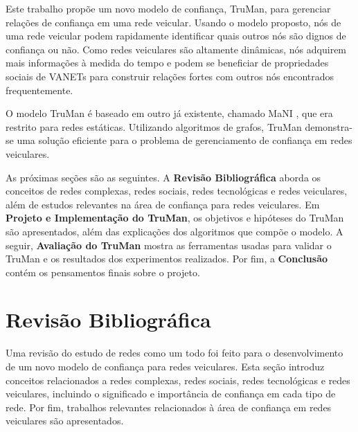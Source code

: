 \begin{resumoextendido}
	Este trabalho propõe um novo modelo de confiança, TruMan, para gerenciar relações de confiança em uma rede veicular.
	Usando o modelo proposto, nós de uma rede veicular podem rapidamente identificar quais outros nós são dignos de confiança ou não.
	Como redes veiculares são altamente dinâmicas, nós adquirem mais informações à medida do tempo e podem se beneficiar de propriedades sociais de VANETs para construir relações fortes com outros nós encontrados frequentemente.
	
	O modelo TruMan é baseado em outro já existente, chamado MaNI \citep{vernize2015malicious}, que era restrito para redes estáticas.
	Utilizando algoritmos de grafos, TruMan demonstra-se uma solução eficiente para o problema de gerenciamento de confiança em redes veiculares.
	
	As próximas seções são as seguintes.
	A \textbf{Revisão Bibliográfica} aborda os conceitos de redes complexas, redes sociais, redes tecnológicas e redes veiculares, além de estudos relevantes na área de confiança para redes veiculares.
	Em \textbf{Projeto e Implementação do TruMan}, os objetivos e hipóteses do TruMan são apresentados, além das explicações dos algoritmos que compõe o modelo.
	A seguir, \textbf{Avaliação do TruMan} mostra as ferramentas usadas para validar o TruMan e os resultados dos experimentos realizados.
	Por fim, a \textbf{Conclusão} contém os pensamentos finais sobre o projeto.
		
	\section*{Revisão Bibliográfica}
	
	Uma revisão do estudo de redes como um todo foi feito para o desenvolvimento de um novo modelo de confiança para redes veiculares.
	Esta seção introduz conceitos relacionados a redes complexas, redes sociais, redes tecnológicas e redes veiculares, incluindo o significado e importância de confiança em cada tipo de rede.
	Por fim, trabalhos relevantes relacionados à área de confiança em redes veiculares são apresentados.
	

\end{resumoextendido}
